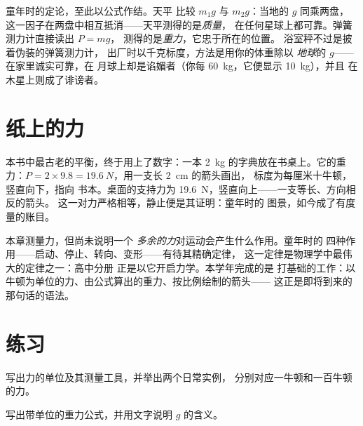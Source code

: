 \begin{remark}[两种秤的最终评判]\label{rem:g9:weight-vs-mass:scales}
童年时的定论，至此以公式作结。天平
比较 $m_1 g$ 与 $m_2 g$：当地的 $g$ 同乘两盘，
这一因子在两盘中相互抵消——天平测得的是\emph{质量}，
在任何星球上都可靠。弹簧测力计直接读出 $P = m g$，
测得的是\emph{重力}，它忠于所在的位置。
浴室秤不过是披着伪装的弹簧测力计，
出厂时以千克标度，方法是用你的体重除以
\emph{地球}的 $g$——在家里诚实可靠，在
月球上却是谄媚者（你每 \qty{60}{kg}，它便显示 \qty{10}{kg}），并且
在木星上则成了诽谤者。
\end{remark}

\section{纸上的力}

\begin{example}\label{ex:g9:weight-vs-mass:book}
本书中最古老的平衡，终于用上了数字：一本
\qty{2}{kg} 的字典放在书桌上。它的重力：$P = 2
\times 9.8 = \qty{19.6}{N}$，用一支长 \qty{2}{cm} 的箭头画出，
标度为每厘米十牛顿，竖直向下，指向
书本。桌面的支持力为
\qty{19.6}{N}，竖直向上——一支等长、方向相反的箭头。
这一对力严格相等，静止便是其证明：童年时的
图景，如今成了有度量的账目。
\end{example}

\begin{remark}\label{rem:g9:weight-vs-mass:dynamics}
本章测量力，但尚未说明一个
\emph{多余的力}对运动会产生什么作用。童年时的
四种作用——启动、停止、转向、变形——有待其精确定律，
这一定律是物理学中最伟大的定律之一：高中分册
正是以它开启力学。本学年完成的是
打基础的工作：以牛顿为单位的力、由公式算出的重力、按比例绘制的箭头——
这正是即将到来的那句话的语法。
\end{remark}

\section{练习}

\begin{exercise}[$\star$]\label{exo:g9:weight-vs-mass:1}
写出力的单位及其测量工具，并举出两个日常实例，
分别对应一牛顿和一百牛顿的力。
\end{exercise}

\begin{exercise}[$\star$]\label{exo:g9:weight-vs-mass:2}
写出带单位的重力公式，并用文字说明
$g$ 的含义。
\end{exercise}

